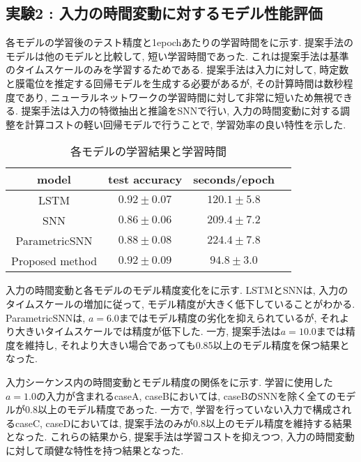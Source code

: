 \makeatletter %
\subsection{実験2 : 入力の時間変動に対するモデル性能評価}

各モデルの学習後のテスト精度と1epochあたりの学習時間をに示す.
提案手法のモデルは他のモデルと比較して, 短い学習時間であった.
これは提案手法は基準のタイムスケールのみを学習するためである.
提案手法は入力に対して, 時定数と膜電位を推定する回帰モデルを生成する必要があるが, その計算時間は数秒程度であり, ニューラルネットワークの学習時間に対して非常に短いため無視できる.
提案手法は入力の特徴抽出と推論をSNNで行い, 入力の時間変動に対する調整を計算コストの軽い回帰モデルで行うことで, 学習効率の良い特性を示した.
\begin{table}[htb]
    \centering
    \caption{各モデルの学習結果と学習時間}
    \label{sec4:tab:exp2}
    \begin{tabular}{cccc}
        \hline
        \textbf{model}&\textbf{test accuracy}&\textbf{seconds/epoch}\\
        \hline
        LSTM&$0.92\pm0.07$&$120.1\pm5.8$\\
        SNN&$0.86\pm0.06$&$209.4\pm7.2$\\
        ParametricSNN&$0.88\pm0.08$&$224.4\pm7.8$\\
        Proposed method&$0.92\pm0.09$&$94.8\pm3.0$\\
    \end{tabular}
\end{table}

入力の時間変動と各モデルのモデル精度変化をに示す.
LSTMとSNNは, 入力のタイムスケールの増加に従って, モデル精度が大きく低下していることがわかる.
ParametricSNNは, $a=6.0$まではモデル精度の劣化を抑えられているが, それより大きいタイムスケールでは精度が低下した.
一方, 提案手法は$a=10.0$までは精度を維持し, それより大きい場合であっても0.85以上のモデル精度を保つ結果となった.

入力シーケンス内の時間変動とモデル精度の関係をに示す.
学習に使用した$a=1.0$の入力が含まれるcaseA, caseBにおいては, caseBのSNNを除く全てのモデルが0.8以上のモデル精度であった.
一方で, 学習を行っていない入力で構成されるcaseC, caseDにおいては, 提案手法のみが0.8以上のモデル精度を維持する結果となった.
これらの結果から, 提案手法は学習コストを抑えつつ, 入力の時間変動に対して頑健な特性を持つ結果となった.